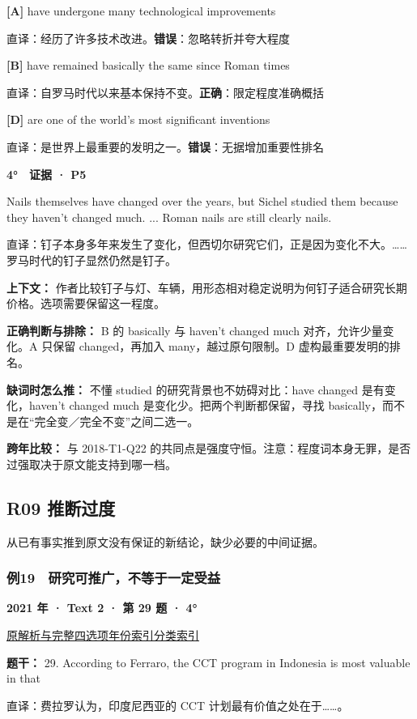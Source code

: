 \documentclass[11pt,a4paper]{article}
\begin{document}
\noindent\textbf{[A]} have undergone many technological improvements\par\nopagebreak
\noindent 直译：经历了许多技术改进。\quad\textbf{错误}：忽略转折并夸大程度\par\smallskip
{}\noindent\textbf{[B]} have remained basically the same since Roman times\par\nopagebreak
\noindent 直译：自罗马时代以来基本保持不变。\quad\textbf{正确}：限定程度准确概括\par\smallskip
{}\noindent\textbf{[D]} are one of the world’s most significant inventions\par\nopagebreak
\noindent 直译：是世界上最重要的发明之一。\quad\textbf{错误}：无据增加重要性排名\par\smallskip
\begin{evidence}\textbf{4°　证据 · P5}\par Nails themselves have changed over the years, but Sichel studied them because they haven’t changed much. ... Roman nails are still clearly nails.\par 直译：钉子本身多年来发生了变化，但西切尔研究它们，正是因为变化不大。……罗马时代的钉子显然仍然是钉子。\end{evidence}
\noindent\textbf{上下文：} 作者比较钉子与灯、车辆，用形态相对稳定说明为何钉子适合研究长期价格。选项需要保留这一程度。\par\smallskip
\noindent\textbf{正确判断与排除：} B 的 basically 与 haven’t changed much 对齐，允许少量变化。A 只保留 changed，再加入 many，越过原句限制。D 虚构最重要发明的排名。\par\smallskip
\noindent\textbf{缺词时怎么推：} 不懂 studied 的研究背景也不妨碍对比：have changed 是有变化，haven’t changed much 是变化少。把两个判断都保留，寻找 basically，而不是在“完全变／完全不变”之间二选一。\par\smallskip
\noindent\textbf{跨年比较：} 与 2018-T1-Q22 的共同点是强度守恒。注意：程度词本身无罪，是否过强取决于原文能支持到哪一档。\par\smallskip
\clearpage
\subsection{R09 推断过度}
从已有事实推到原文没有保证的新结论，缺少必要的中间证据。

\subsubsection{例19　研究可推广，不等于一定受益}\label{case-2021-T2-Q29}
\noindent\textbf{2021 年 · Text 2 · 第 29 题 · 4°}\par\noindent \href{https://zj139.github.io/math-notes/english/b002297fb20aa6c5b4babd05/\#q29}{原解析与完整四选项}\quad \hyperref[idx-2021-T2-Q29]{年份索引}\quad \hyperref[class-R09]{分类索引}\par\smallskip
\noindent\textbf{题干：} 29. According to Ferraro, the CCT program in Indonesia is most valuable in that\par\smallskip
直译：费拉罗认为，印度尼西亚的 CCT 计划最有价值之处在于……。
\end{document}
